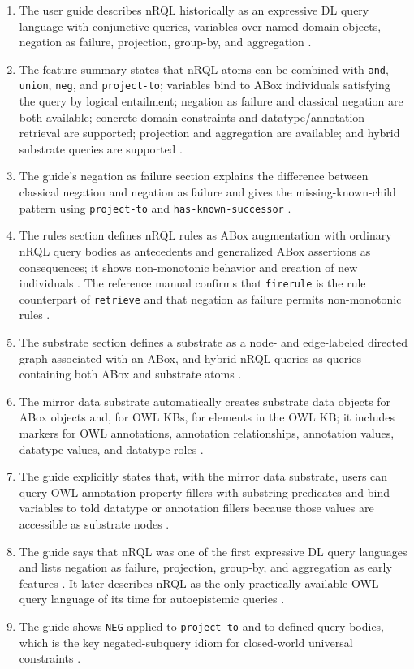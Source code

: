 \documentclass[11pt,letterpaper]{article}
\newcommand{\nrql}{nRQL}
\newcommand{\naf}{negation as failure}
\newcommand{\abox}{ABox}
\newcommand{\owl}{OWL}
\begin{document}
\begin{enumerate}[leftmargin=2em]
  \item The user guide describes \nrql{} historically as an expressive DL query language with conjunctive queries, variables over named domain objects, \naf{}, projection, group-by, and aggregation \cite[p.~4]{racerug}.
  \item The feature summary states that \nrql{} atoms can be combined with \texttt{and}, \texttt{union}, \texttt{neg}, and \texttt{project-to}; variables bind to \abox{} individuals satisfying the query by logical entailment; \naf{} and classical negation are both available; concrete-domain constraints and datatype/annotation retrieval are supported; projection and aggregation are available; and hybrid substrate queries are supported \cite[pp.~81--84]{racerug}.
  \item The guide's \naf{} section explains the difference between classical negation and \naf{} and gives the missing-known-child pattern using \texttt{project-to} and \texttt{has-known-successor} \cite[pp.~113--120]{racerug}.
  \item The rules section defines \nrql{} rules as \abox{} augmentation with ordinary \nrql{} query bodies as antecedents and generalized \abox{} assertions as consequences; it shows non-monotonic behavior and creation of new individuals \cite[pp.~125--127]{racerug}. The reference manual confirms that \texttt{firerule} is the rule counterpart of \texttt{retrieve} and that \naf{} permits non-monotonic rules \cite[pp.~160--161]{racerrm}.
  \item The substrate section defines a substrate as a node- and edge-labeled directed graph associated with an \abox{}, and hybrid \nrql{} queries as queries containing both \abox{} and substrate atoms \cite[pp.~133--137]{racerug}.
  \item The mirror data substrate automatically creates substrate data objects for \abox{} objects and, for \owl{} KBs, for elements in the \owl{} KB; it includes markers for \owl{} annotations, annotation relationships, annotation values, datatype values, and datatype roles \cite[pp.~137--141]{racerug}.
  \item The guide explicitly states that, with the mirror data substrate, users can query \owl{} annotation-property fillers with substring predicates and bind variables to told datatype or annotation fillers because those values are accessible as substrate nodes \cite[pp.~141--143]{racerug}.
  \item The guide says that \nrql{} was one of the first expressive DL query languages and lists \naf{}, projection, group-by, and aggregation as early features \cite[p.~4]{racerug}. It later describes \nrql{} as the only practically available \owl{} query language of its time for autoepistemic queries \cite[p.~82]{racerug}.
  \item The guide shows \texttt{NEG} applied to \texttt{project-to} and to defined query bodies, which is the key negated-subquery idiom for closed-world universal constraints \cite[pp.~119--122]{racerug}.
\end{enumerate}
\end{document}
